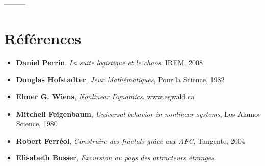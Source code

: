 %
%
  \begin{center}
  ---------
  \end{center}
\section*{Références}
\begin{itemize}
\item \textbf{Daniel Perrin}, \textit{La suite logistique et le chaos}, IREM, 2008
\item \textbf{Douglas Hofstadter}, \textit{Jeux Mathématiques}, Pour la Science, 1982
\item \textbf{Elmer G. Wiens}, \textit{Nonlinear Dynamics}, www.egwald.ca
\item \textbf{Mitchell Feigenbaum}, \textit{Universal behavior in nonlinear systems}, Los Alamos Science, 1980
\item \textbf{Robert Ferréol}, \textit{Construire des fractals grâce aux AFC}, Tangente, 2004
\item \textbf{Elisabeth Busser}, \textit{Excursion au pays des attracteurs étranges}
\end{itemize}